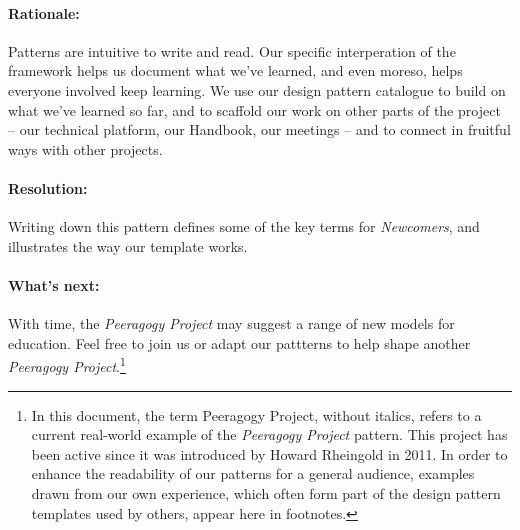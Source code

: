 \paragraph{Rationale:}
Patterns are intuitive to write and read.  Our specific interperation of the framework helps us document what we've learned, and even moreso, helps everyone involved keep learning.  We use our design pattern catalogue to build on what we've learned so far, and to scaffold our work on other parts of the project -- our technical platform, our Handbook, our meetings -- and to connect in fruitful ways with other projects.  

\paragraph{Resolution:}  
Writing down this pattern defines some of the key terms for \emph{Newcomers}, and illustrates the way our template works. 

\paragraph{What's next:} 
With time, the \emph{Peeragogy Project} may suggest a range of new models for education.  Feel free to join us or adapt our pattterns to help shape another \emph{Peeragogy Project}.\footnote{In this document, the term Peeragogy Project, without italics, refers to a current real-world example of the \emph{Peeragogy Project} pattern.   This project has been active since it was introduced by Howard Rheingold in 2011.  In order to enhance the readability of our patterns for a general audience, examples drawn from our own experience, which often form part of the design pattern templates used by others, appear here in footnotes.}
